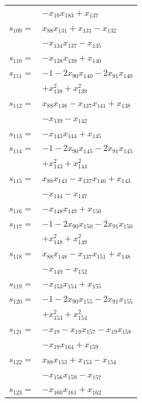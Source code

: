 \begin{longtable}{@{}r@{\;}l@{}}
 & \(\displaystyle -x_{19}x_{183} +x_{137}\) \\[3pt]
\(s_{109}=\) & \(\displaystyle x_{88}x_{131} +x_{131} -x_{132}\) \\
 & \(\displaystyle -x_{134}x_{137} -x_{135}\) \\[3pt]
\(s_{110}=\) & \(\displaystyle -x_{138}x_{139} +x_{140}\) \\[3pt]
\(s_{111}=\) & \(\displaystyle -1 -2x_{90}x_{140} -2x_{91}x_{140}\) \\
 & \(\displaystyle +x_{138}^{2} +x_{139}^{2}\) \\[3pt]
\(s_{112}=\) & \(\displaystyle x_{88}x_{138} -x_{137}x_{141} +x_{138}\) \\
 & \(\displaystyle -x_{139} -x_{142}\) \\[3pt]
\(s_{113}=\) & \(\displaystyle -x_{143}x_{144} +x_{145}\) \\[3pt]
\(s_{114}=\) & \(\displaystyle -1 -2x_{90}x_{145} -2x_{91}x_{145}\) \\
 & \(\displaystyle +x_{143}^{2} +x_{144}^{2}\) \\[3pt]
\(s_{115}=\) & \(\displaystyle x_{88}x_{143} -x_{137}x_{146} +x_{143}\) \\
 & \(\displaystyle -x_{144} -x_{147}\) \\[3pt]
\(s_{116}=\) & \(\displaystyle -x_{148}x_{149} +x_{150}\) \\[3pt]
\(s_{117}=\) & \(\displaystyle -1 -2x_{90}x_{150} -2x_{91}x_{150}\) \\
 & \(\displaystyle +x_{148}^{2} +x_{149}^{2}\) \\[3pt]
\(s_{118}=\) & \(\displaystyle x_{88}x_{148} -x_{137}x_{151} +x_{148}\) \\
 & \(\displaystyle -x_{149} -x_{152}\) \\[3pt]
\(s_{119}=\) & \(\displaystyle -x_{153}x_{154} +x_{155}\) \\[3pt]
\(s_{120}=\) & \(\displaystyle -1 -2x_{90}x_{155} -2x_{91}x_{155}\) \\
 & \(\displaystyle +x_{153}^{2} +x_{154}^{2}\) \\[3pt]
\(s_{121}=\) & \(\displaystyle -x_{19} -x_{19}x_{157} -x_{19}x_{158}\) \\
 & \(\displaystyle -x_{19}x_{164} +x_{159}\) \\[3pt]
\(s_{122}=\) & \(\displaystyle x_{88}x_{153} +x_{153} -x_{154}\) \\
 & \(\displaystyle -x_{156}x_{159} -x_{157}\) \\[3pt]
\(s_{123}=\) & \(\displaystyle -x_{160}x_{161} +x_{162}\) \\[3pt]

\end{longtable}

